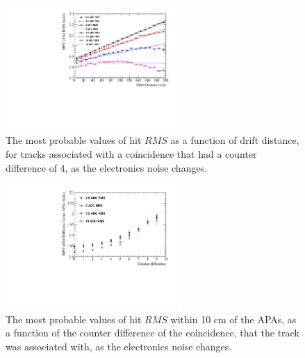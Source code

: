 \begin{figure}[h!]
  \centering
  \includegraphics[width=0.6\textwidth]{Canvas_CountDiff4_All_Positions_NoiseLevel}
  \caption[The drift distance dependence of diffusion in the 35 ton dataset and Monte Carlo for coincidences with a counter difference of 4, as the electronics noise changes]
          {The most probable values of hit $RMS$ as a function of drift distance, for tracks associated with a coincidence that had a counter difference of 4, as the electronics noise changes.}
  \label{fig:DiffNoiseStudy_CDiff4}
\end{figure}

\begin{figure}[h!]
  \centering
  \includegraphics[width=0.6\textwidth]{Canvas_All_Angles_RMS0cm_NoiseLevel}
  \caption[The angular dependence of diffusion in the 35 ton dataset and Monte Carlo for hits within 10 cm of the APAs, as the electronics noise changes]
          {The most probable values of hit $RMS$ within 10 cm of the APAs, as a function of the counter difference of the coincidence, that the track was associated with, as the electronics noise changes.}
  \label{fig:DiffNoiseStudy_RMS0cm}
\end{figure}

